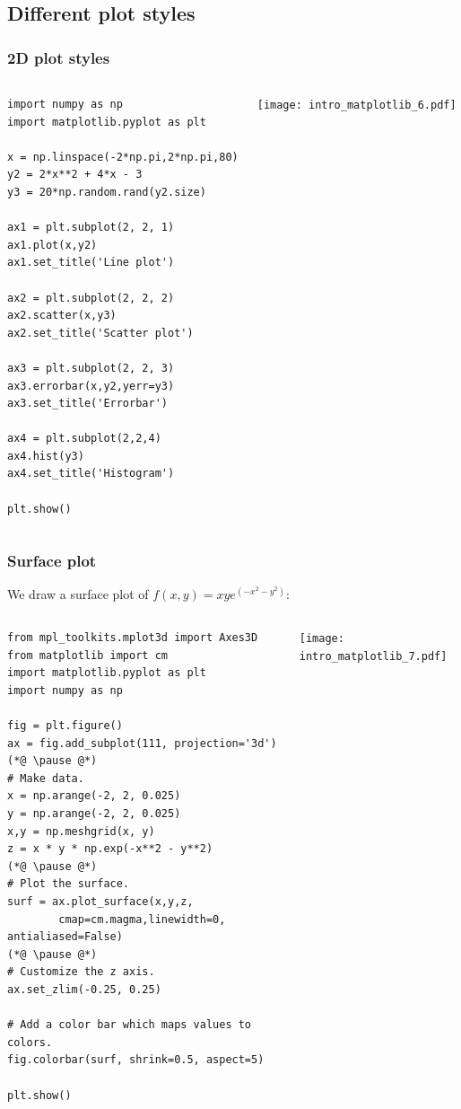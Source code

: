 {\nologo
\subsection{Different plot styles}
\begin{frame}[fragile]
  \frametitle{2D plot styles}
  \begin{columns}[T]
      \begin{lstlisting}
import numpy as np
import matplotlib.pyplot as plt

x = np.linspace(-2*np.pi,2*np.pi,80)
y2 = 2*x**2 + 4*x - 3
y3 = 20*np.random.rand(y2.size)

ax1 = plt.subplot(2, 2, 1) 
ax1.plot(x,y2)
ax1.set_title('Line plot')

ax2 = plt.subplot(2, 2, 2) 
ax2.scatter(x,y3)
ax2.set_title('Scatter plot')

ax3 = plt.subplot(2, 2, 3) 
ax3.errorbar(x,y2,yerr=y3)
ax3.set_title('Errorbar')

ax4 = plt.subplot(2,2,4)
ax4.hist(y3)
ax4.set_title('Histogram')

plt.show()
      \end{lstlisting}
      \texttt{[image: intro\_matplotlib\_6.pdf]}
  \end{columns}
\end{frame}
}

\begin{frame}[fragile]
  \frametitle{Surface plot}
  We draw a surface plot of $\displaystyle f(x,y) = xy e^{\left(-x^2 -y^2 \right)}$:
  \begin{columns}
      \begin{lstlisting}[basicstyle=\tiny\ttfamily]
from mpl_toolkits.mplot3d import Axes3D
from matplotlib import cm
import matplotlib.pyplot as plt
import numpy as np

fig = plt.figure()
ax = fig.add_subplot(111, projection='3d')
(*@ \pause @*)
# Make data.
x = np.arange(-2, 2, 0.025)
y = np.arange(-2, 2, 0.025)
x,y = np.meshgrid(x, y)
z = x * y * np.exp(-x**2 - y**2)
(*@ \pause @*)
# Plot the surface.
surf = ax.plot_surface(x,y,z, 
        cmap=cm.magma,linewidth=0, antialiased=False)
(*@ \pause @*)
# Customize the z axis.
ax.set_zlim(-0.25, 0.25)

# Add a color bar which maps values to colors.
fig.colorbar(surf, shrink=0.5, aspect=5)

plt.show()
      \end{lstlisting}
      \texttt{[image: intro\_matplotlib\_7.pdf]}
  \end{columns}
\end{frame}


